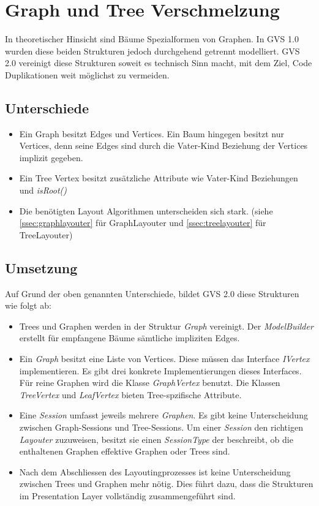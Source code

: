 \documentclass[11pt,a4paper,english,oneside]{book}
\numberwithin{equation}{chapter}
\begin{document}
	\section{Graph und Tree Verschmelzung} \label{graph-vs-tree}
	In theoretischer Hinsicht sind Bäume Spezialformen von Graphen. In GVS 1.0 wurden diese beiden Strukturen jedoch durchgehend getrennt modelliert. GVS 2.0 vereinigt diese Strukturen soweit es technisch Sinn macht, mit dem Ziel, Code Duplikationen weit möglichst zu vermeiden.
	
	\subsection{Unterschiede}
	\begin{itemize}
		\item Ein Graph besitzt Edges und Vertices. Ein Baum hingegen besitzt nur Vertices, denn seine Edges sind durch die Vater-Kind Beziehung der Vertices implizit gegeben. 
		\item Ein Tree Vertex besitzt zusätzliche Attribute wie Vater-Kind Beziehungen und \textit{isRoot()}
		\item Die benötigten Layout Algorithmen unterscheiden sich stark. (siehe \ref{ssec:graphlayouter} für GraphLayouter und \ref{ssec:treelayouter} für TreeLayouter)
	\end{itemize}
	
	\subsection{Umsetzung}
	Auf Grund der oben genannten Unterschiede, bildet GVS 2.0 diese Strukturen wie folgt ab:
	
	\begin{itemize}
		\item Trees und Graphen werden in der Struktur \textit{Graph} vereinigt. Der \textit{ModelBuilder} erstellt für empfangene Bäume sämtliche impliziten Edges.
		\item Ein \textit{Graph} besitzt eine Liste von Vertices. Diese müssen das Interface \textit{IVertex} implementieren. Es gibt drei konkrete Implementierungen dieses Interfaces. Für reine Graphen wird die Klasse \textit{GraphVertex} benutzt. Die Klassen \textit{TreeVertex} und \textit{LeafVertex} bieten Tree-spzifische Attribute.
		\item Eine \textit{Session} umfasst jeweils mehrere \textit{Graphen}. Es gibt keine Unterscheidung zwischen Graph-Sessions und Tree-Sessions. Um einer \textit{Session} den richtigen \textit{Layouter} zuzuweisen, besitzt sie einen \textit{SessionType} der beschreibt, ob die enthaltenen Graphen effektive Graphen oder Trees sind.
		\item Nach dem Abschliessen des Layoutingprozesses ist keine Unterscheidung zwischen Trees und Graphen mehr nötig. Dies führt dazu, dass die Strukturen im Presentation Layer vollständig zusammengeführt sind.
	\end{itemize}
\end{document}

